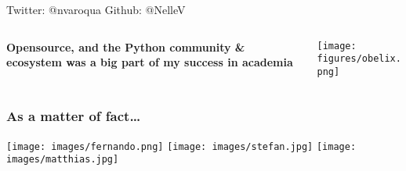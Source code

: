 \documentclass[xcolor=dvipsnames]{beamer}
\begin{document}
\begin{frame}
\begin{columns}
\begin{column}{0.6\linewidth}
\begin{overlayarea}{\linewidth}{6cm}
\end{overlayarea}
\end{column}
\end{columns}
{\footnotesize
\vspace{3em}
\begin{center}
Twitter: @nvaroqua \hspace{3em} Github: @NelleV
\end{center}
}
\end{frame}


\begin{frame}

\begin{columns}
\begin{column}{0.6\linewidth}
{\Large \bf Opensource, and the Python community \& ecosystem was a big part of my success in academia}
\end{column}
\begin{column}{0.4\linewidth}
\begin{flushright}
\texttt{[image: figures/obelix.png]}
\end{flushright}
\end{column}
\end{columns}
\end{frame}

\begin{frame}
\frametitle{As a matter of fact\dots}
\begin{center}
\texttt{[image: images/fernando.png]}
\hspace{2em}
\texttt{[image: images/stefan.jpg]}
\hspace{2em}
\texttt{[image: images/matthias.jpg]}
\end{center}

\end{frame}
\end{document}
